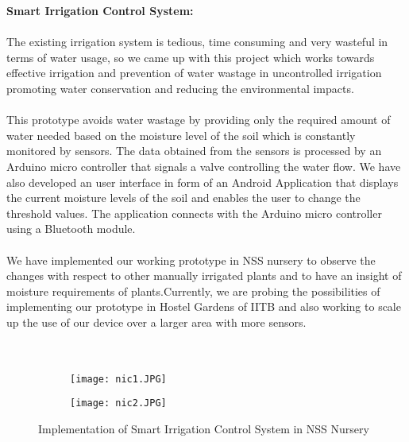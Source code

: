 \noindent\textbf{\Large \linebreak Smart Irrigation Control System:}\\ \\The existing irrigation system is tedious, time consuming and very wasteful in terms of
water usage, so we came up with this project which works towards effective irrigation
and prevention of water wastage in uncontrolled irrigation promoting water conservation
and reducing the environmental impacts.
\\ \\ This prototype avoids water wastage by providing only the required amount of water
needed based on the moisture level of the soil which is constantly monitored by
sensors. The data obtained from the sensors is processed by an Arduino
micro controller that signals a valve controlling the water flow.
We have also developed an user interface in form of an Android Application that
displays the current moisture levels of the soil and enables the user to change the
threshold values. The application connects with the Arduino micro controller using a
Bluetooth module.
\\ \\ We have implemented our working prototype in NSS nursery to observe the changes
with respect to other manually irrigated plants and to have an insight of moisture
requirements of plants.Currently, we are probing the possibilities of implementing our prototype in Hostel
Gardens of IITB and also working to scale up the use of our device over a larger area
with more sensors. \\ \\ \\

\begin{figure}[H]
\centering
\begin{subfigure}{.5\textwidth}
 \centering
 \texttt{[image: nic1.JPG]}
\end{subfigure}%
\begin{subfigure}{.5\textwidth}
\texttt{[image: nic2.JPG]}
\end{subfigure}
\caption*{Implementation of Smart Irrigation Control System in NSS Nursery}
\end{figure}

